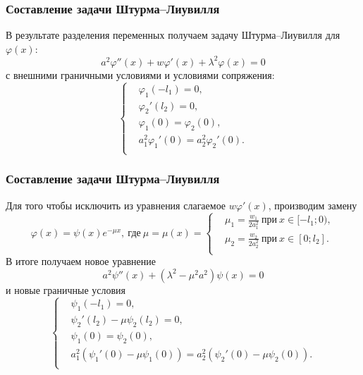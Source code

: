 \documentclass[10pt,pdf,hyperref={unicode}]{beamer}
\begin{document}
\begin{frame}
  \frametitle{Составление задачи Штурма--Лиувилля}
  В результате разделения переменных получаем задачу Штурма--Лиувилля для $\varphi(x)$:
  \begin{equation*}
    a^2 \varphi''(x) + w \varphi'(x) + \lambda^2\varphi(x)=0 
  \end{equation*}
  с внешними граничными условиями и условиями сопряжения:
  \begin{equation*}
    \left\{
    \begin{aligned}
      & \varphi_1(-l_1) = 0, \\
      & \varphi_2'(l_2) = 0, \\
      & \varphi_1(0) = \varphi_2(0), \\
      & a_1^2 \varphi_1'(0) = a_2^2 \varphi_2'(0). \\
    \end{aligned}
    \right.
  \end{equation*}
\end{frame}

\begin{frame}
  \frametitle{Составление задачи Штурма--Лиувилля}
  Для того чтобы исключить из уравнения слагаемое $w\varphi'(x)$, производим замену 
  \begin{equation*}
    \varphi(x) = \psi(x) e^{- \mu x},\ \text{где}\ \mu=\mu(x) = \left\{
      \begin{aligned}
        & \mu_1 = \frac{w_1}{2a_1^2}\ \text{при}\ x \in [-l_1;0), \\
        & \mu_2 = \frac{w_2}{2a_2^2}\ \text{при}\ x \in [0;l_2]. \\
      \end{aligned}
      \right.
  \end{equation*}
  В итоге получаем новое уравнение
  \begin{equation*}
    a^2\psi''(x) + (\lambda^2 - \mu^2a^2) \psi(x) = 0
    \label{eq:3}
  \end{equation*}
  и новые граничные условия
  \begin{equation*}
    \left\{
    \begin{aligned}
      & \psi_1(-l_1) = 0, \\
      & \psi_2'(l_2) - \mu\psi_2(l_2) = 0, \\
      & \psi_1(0) = \psi_2(0), \\
      & a_1^2(\psi_1'(0) - \mu\psi_1(0)) =  a_2^2(\psi_2'(0) - \mu\psi_2(0)). \\
    \end{aligned}
    \right.
    \label{}
  \end{equation*}
\end{frame}
\end{document}
